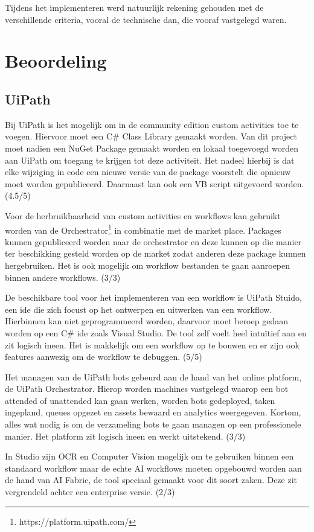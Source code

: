 Tijdens het implementeren werd natuurlijk rekening gehouden met de verschillende criteria, vooral de technische dan, die vooraf vastgelegd waren.

\section{Beoordeling}
\subsection{UiPath}
Bij UiPath is het mogelijk om in de community edition custom activities toe te voegen. Hiervoor moet een C\# Class Library gemaakt worden. Van dit project moet nadien een NuGet Package gemaakt worden en lokaal toegevoegd worden aan UiPath om toegang te krijgen tot deze activiteit. Het nadeel hierbij is dat elke wijziging in code een nieuwe versie van de package voorstelt die opnieuw moet worden gepubliceerd. Daarnaast kan ook een VB script uitgevoerd worden. (4.5/5)

Voor de herbruikbaarheid van custom activities en workflows kan gebruikt worden van de Orchestrator\footnote{https://platform.uipath.com/} in combinatie met de market place. Packages kunnen gepubliceerd worden naar de orchestrator en deze kunnen op die manier ter beschikking gesteld worden op de market zodat anderen deze package kunnen hergebruiken. Het is ook mogelijk om workflow bestanden te gaan aanroepen binnen andere workflows. (3/3) 

De beschikbare tool voor het implementeren van een workflow is UiPath Stuido, een ide die zich focust op het ontwerpen en uitwerken van een workflow. Hierbinnen kan niet geprogrammeerd worden, daarvoor moet beroep gedaan worden op een C\# ide zoals Visual Studio. De tool zelf voelt heel intuïtief aan en zit logisch ineen. Het is makkelijk om een workflow op te bouwen en er zijn ook features aanwezig om de workflow te debuggen. (5/5)

Het managen van de UiPath bots gebeurd aan de hand van het online platform, de UiPath Orchestrator. Hierop worden machines vastgelegd waarop een bot attended of unattended kan gaan werken, worden bots gedeployed, taken ingepland, queues opgezet en assets bewaard en analytics weergegeven. Kortom, alles wat nodig is om de verzameling bots te gaan managen op een professionele manier. Het platform zit logisch ineen en werkt uitstekend. (3/3)

In Studio zijn OCR en Computer Vision mogelijk om te gebruiken binnen een standaard workflow maar de echte AI workflows moeten opgebouwd worden aan de hand van AI Fabric, de tool speciaal gemaakt voor dit soort zaken. Deze zit vergrendeld achter een enterprise versie. (2/3)

